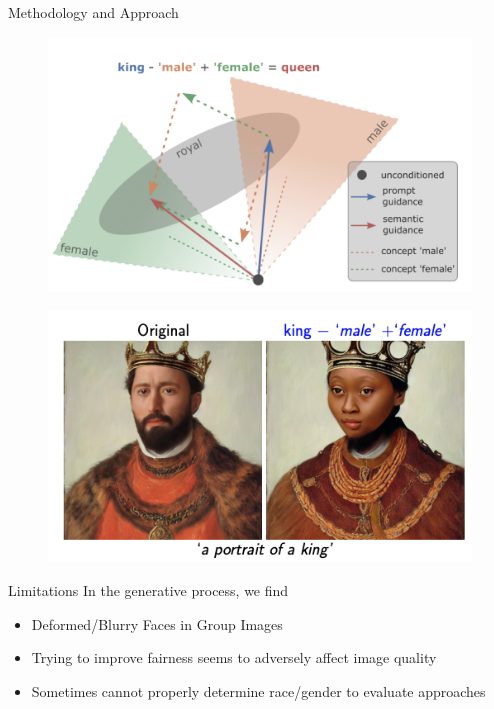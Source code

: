 \documentclass[final]{beamer}
\newlength{\onecolwid}
\begin{document}
\begin{frame}[t]
\begin{columns}[t]
\begin{column}{\onecolwid}
\begin{block}{Methodology and Approach}
\begin{center}
\begin{figure}
\centering
\begin{minipage}{.5\textwidth}
  \centering
    \includegraphics[scale = 0.75]{SeGA_Outline.png}
  \label{fig:embeddings}
\end{minipage}%
\begin{minipage}{.5\textwidth}
  \centering
    \includegraphics[scale = 0.75]{SeGA_Output.png}
  \label{fig:sega_ex}
\end{minipage}
\end{figure}
\end{center}

\vspace{-2cm}
\end{block}

\begin{block}{Limitations}
In the generative process, we find 
\begin{itemize}
    \item Deformed/Blurry Faces in Group Images
    \item Trying to improve fairness seems to adversely affect image quality
    \item Sometimes cannot properly determine race/gender to evaluate approaches
\end{itemize}


\end{block}
\end{column}
\end{columns}
\end{frame}
\end{document}
